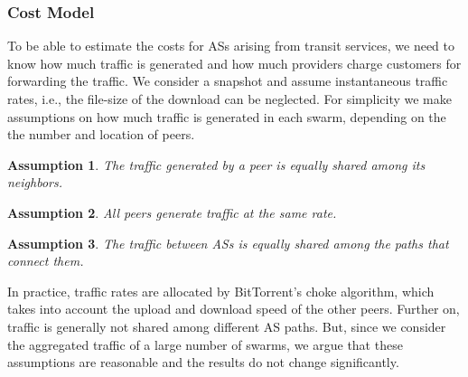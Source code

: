
\subsubsection{Cost Model}

To be able to estimate the costs for ASs arising from transit services, we need to know how much traffic is generated and how much providers charge customers for forwarding the traffic.
We consider a snapshot and assume instantaneous traffic rates, i.e., the file-size of the download can be neglected.
For simplicity we make assumptions on how much traffic is generated in each swarm, depending on the the number and location of peers.
\newtheorem{assa}{Assumption}\begin{assa}\label{npeers}
The traffic generated by a peer is equally shared among its neighbors.
\end{assa}
\newtheorem{assb}[assa]{Assumption}\begin{assb}\label{ntraffic}
All peers generate traffic at the same rate.
\end{assb}
\newtheorem{assc}[assa]{Assumption}\begin{assc}\label{npaths}
The traffic between ASs is equally shared among the paths that connect them.
\end{assc}
In practice, traffic rates are allocated by BitTorrent's choke algorithm, which takes into account the upload and download speed of the other peers. Further on, traffic is generally not shared among different AS paths. But, since we consider the aggregated traffic of a large number of swarms, we argue that these assumptions are reasonable and the results do not change significantly.
